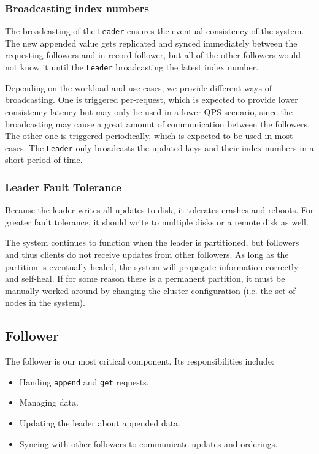 \documentclass[11pt,english,twocolumn]{article}
\begin{document}
\subsubsection{Broadcasting index numbers}
The broadcasting of the \texttt{Leader} ensures the eventual consistency of the system. The new appended value gets replicated and synced immediately between the requesting followers and in-record follower, but all of the other followers would not know it until the \texttt{Leader} broadcasting the latest index number. 

Depending on the workload and use cases, we provide different ways of broadcasting. One is triggered per-request, which is expected to provide lower consistency latency but may only be used in a lower QPS scenario, since the broadcasting may cause a great amount of communication between the followers. The other one is triggered periodically, which is expected to be used in most cases. The \texttt{Leader} only broadcasts the updated keys and their index numbers in a short period of time.

\subsubsection{Leader Fault Tolerance}
Because the leader writes all updates to disk, it tolerates crashes and reboots.
For greater fault tolerance, it should write to multiple disks or a remote disk
as well.

The system continues to function when the leader is partitioned, but followers
and thus clients do not receive updates from other followers. As long as the
partition is eventually healed, the system will propagate information correctly
and self-heal. If for some reason there is a permanent partition, it must be
manually worked around by changing the cluster configuration (i.e. the set of
nodes in the system).

\subsection{Follower}
The follower is our most critical component. Its responsibilities include:

\begin{itemize}
	\item Handing \texttt{append} and \texttt{get} requests. \vspace{-0.4cm}
	\item Managing data. \vspace{-0.4cm}
	\item Updating the leader about appended data. \vspace{-0.4cm}
	\item Syncing with other followers to communicate updates and orderings.
\end{itemize}
\end{document}
